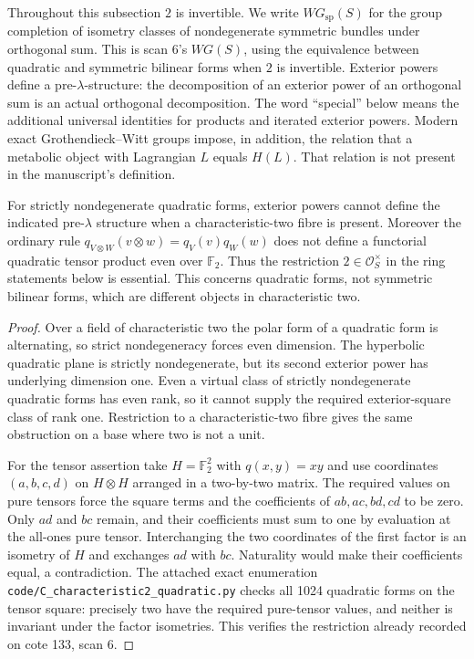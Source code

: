 Throughout this subsection $2$ is invertible. We write $WG_{\mathrm{sp}}(S)$
for the group completion of isometry classes of nondegenerate symmetric
bundles under orthogonal sum. This is scan 6's $WG(S)$, using the equivalence
between quadratic and symmetric bilinear forms when $2$ is invertible.
Exterior powers define a pre-$\lambda$-structure: the decomposition of an
exterior power of an orthogonal sum is an actual orthogonal decomposition.
The word ``special'' below means the additional universal identities for
products and iterated exterior powers. Modern exact Grothendieck--Witt groups
impose, in addition, the relation that a metabolic object with Lagrangian $L$
equals $H(L)$. That relation is not present in the manuscript's definition.

\begin{proposition}
\label{C:char2_boundary}
For strictly nondegenerate quadratic forms, exterior powers cannot define
the indicated pre-$\lambda$ structure when a characteristic-two fibre is
present. Moreover the ordinary rule
$q_{V\otimes W}(v\otimes w)=q_V(v)q_W(w)$ does not define a functorial
quadratic tensor product even over $\mathbb F_2$. Thus the restriction
$2\in\mathcal O_S^\times$ in the ring statements below is essential.
This concerns quadratic forms, not symmetric bilinear forms, which are
different objects in characteristic two.
\end{proposition}
\begin{proof}
Over a field of characteristic two the polar form of a quadratic form
is alternating, so strict nondegeneracy forces even dimension.
The hyperbolic quadratic plane is strictly nondegenerate, but its
second exterior power has underlying dimension one. Even a virtual
class of strictly nondegenerate quadratic forms has even rank, so it
cannot supply the required exterior-square class of rank one.
Restriction to a characteristic-two fibre gives the same obstruction
on a base where two is not a unit.

For the tensor assertion take $H=\mathbb F_2^2$ with $q(x,y)=xy$ and
use coordinates $(a,b,c,d)$ on $H\otimes H$ arranged in a two-by-two
matrix. The required values on pure tensors force the square terms
and the coefficients of $ab,ac,bd,cd$ to be zero. Only $ad$ and $bc$
remain, and their coefficients must sum to one by evaluation at the
all-ones pure tensor. Interchanging the two coordinates of the first
factor is an isometry of $H$ and exchanges $ad$ with $bc$. Naturality
would make their coefficients equal, a contradiction.
The attached exact enumeration
\texttt{code/C\_characteristic2\_quadratic.py} checks all 1024 quadratic
forms on the tensor square: precisely two have the required pure-tensor
values, and neither is invariant under the factor isometries.
This verifies the restriction already recorded on cote 133, scan 6.
\end{proof}

